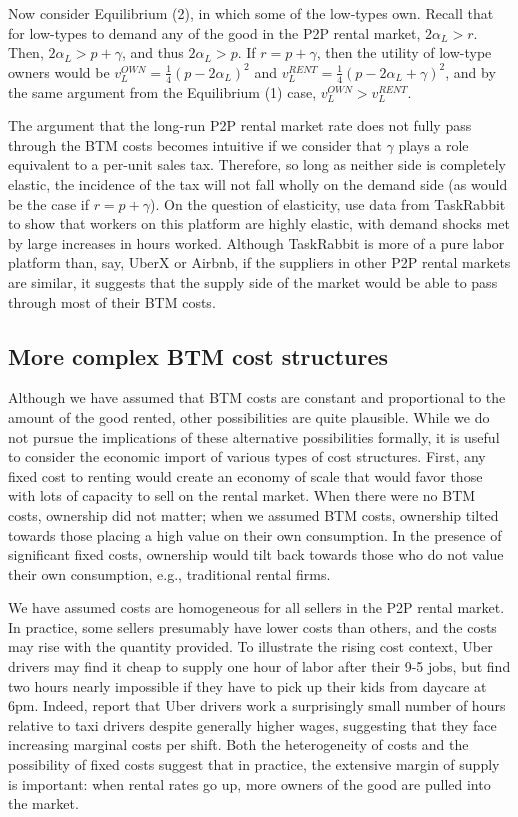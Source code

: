 \documentclass[11pt]{article}
\begin{document}
Now consider Equilibrium (2), in which some of the low-types own.
Recall that for low-types to demand any of the good in the P2P rental market, $2\alpha_L > r$. 
Then, $2\alpha_L > p + \gamma$, and thus $2\alpha_L > p$.
If $r = p + \gamma$, then the utility of low-type owners would be $v_L^{OWN} = \frac{1}{4}(p - 2\alpha_L)^2$ and $v_L^{RENT} = \frac{1}{4}(p - 2\alpha_L + \gamma)^2$, and by the same argument from the Equilibrium (1) case, $v_L^{OWN} > v_L^{RENT}$. 

The argument that the long-run P2P rental market rate does not fully pass through the BTM costs becomes intuitive if we consider that $\gamma$ plays a role equivalent to a per-unit sales tax.
Therefore, so long as neither side is completely elastic, the incidence of the tax will not fall wholly on the demand side (as would be the case if $r = p + \gamma$). 
On the question of elasticity, \cite{cullen2014outsourcing} use data from TaskRabbit to show that workers on this platform are highly elastic, with demand shocks met by large increases in hours worked.
Although TaskRabbit is more of a pure labor platform than, say, UberX or Airbnb, if the suppliers in other P2P rental markets are similar, it suggests that the supply side of the market would be able to pass through most of their BTM costs. 

\subsection{More complex BTM cost structures}

Although we have assumed that BTM costs are constant and proportional to the amount of the good rented, other possibilities are quite plausible.
While we do not pursue the implications of these alternative possibilities formally, it is useful to consider the economic import of various types of cost structures.
First, any fixed cost to renting would create an economy of scale that would favor those with lots of capacity to sell on the rental market.
When there were no BTM costs, ownership did not matter;
when we assumed BTM costs, ownership tilted towards those placing a high value on their own consumption.
In the presence of significant fixed costs, ownership would tilt back towards those who do not value their own consumption, e.g., traditional rental firms. 

We have assumed costs are homogeneous for all sellers in the P2P rental market.
In practice, some sellers presumably have lower costs than others, and the costs may rise with the quantity provided. 
To illustrate the rising cost context, Uber drivers may find it cheap to supply one hour of labor after their 9-5 jobs, but find two hours nearly impossible if they have to pick up their kids from daycare at 6pm.  
Indeed, \cite{hall2015analysis} report that Uber drivers work a surprisingly small number of hours relative to taxi drivers despite generally higher wages, suggesting that they face increasing marginal costs per shift. 
Both the heterogeneity of costs and the possibility of fixed costs suggest that in practice, the extensive margin of supply is important:
when rental rates go up, more owners of the good are pulled into the market. 
\end{document}
